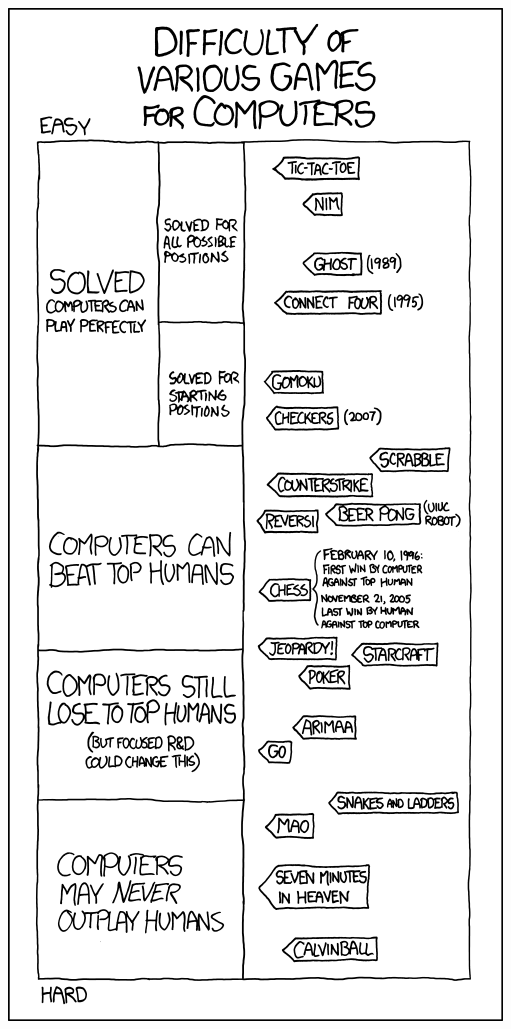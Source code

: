 \documentclass{beamer}
\begin{document}
  \begin{frame}[standout]
    \includegraphics[height=\paperheight]{../img/game_AIs.png}
    \nocite{xkcdGameAIs}
  \end{frame}
\end{document}
